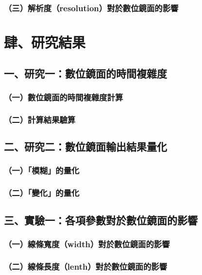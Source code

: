 \documentclass[12pt]{article}
\begin{document}
\subsubsection{（三）解析度（resolution）對於數位鏡面的影響}

\newpage
\section{肆、研究結果}

\subsection{一、研究一：數位鏡面的時間複雜度}

\subsubsection{（一）數位鏡面的時間複雜度計算}

\subsubsection{（二）計算結果驗算}

\subsection{二、研究二：數位鏡面輸出結果量化}

\subsubsection{（一）「模糊」的量化}

\subsubsection{（二）「變化」的量化}

\subsection{三、實驗一：各項參數對於數位鏡面的影響}

\subsubsection{（一）線條寬度（width）對於數位鏡面的影響}

\subsubsection{（二）線條長度（lenth）對於數位鏡面的影響}
\end{document}
